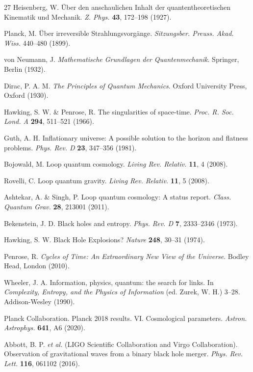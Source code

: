 \documentclass[11pt,a4paper]{article}
\theoremstyle{plain}
\begin{document}
\begin{thebibliography}{27}
Heisenberg, W. \"{U}ber den anschaulichen Inhalt der quantentheoretischen Kinematik und Mechanik. \textit{Z. Phys.} \textbf{43}, 172--198 (1927).

Planck, M. \"{U}ber irreversible Strahlungsvorg\"{a}nge. \textit{Sitzungsber. Preuss. Akad. Wiss.} 440--480 (1899).

von Neumann, J. \textit{Mathematische Grundlagen der Quantenmechanik}. Springer, Berlin (1932).

Dirac, P. A. M. \textit{The Principles of Quantum Mechanics}. Oxford University Press, Oxford (1930).

Hawking, S. W. \& Penrose, R. The singularities of space-time. \textit{Proc. R. Soc. Lond. A} \textbf{294}, 511--521 (1966).

Guth, A. H. Inflationary universe: A possible solution to the horizon and flatness problems. \textit{Phys. Rev. D} \textbf{23}, 347--356 (1981).

Bojowald, M. Loop quantum cosmology. \textit{Living Rev. Relativ.} \textbf{11}, 4 (2008).

Rovelli, C. Loop quantum gravity. \textit{Living Rev. Relativ.} \textbf{11}, 5 (2008).

Ashtekar, A. \& Singh, P. Loop quantum cosmology: A status report. \textit{Class. Quantum Grav.} \textbf{28}, 213001 (2011).

Bekenstein, J. D. Black holes and entropy. \textit{Phys. Rev. D} \textbf{7}, 2333--2346 (1973).

Hawking, S. W. Black Hole Explosions? \textit{Nature} \textbf{248}, 30--31 (1974).

Penrose, R. \textit{Cycles of Time: An Extraordinary New View of the Universe}. Bodley Head, London (2010).

Wheeler, J. A. Information, physics, quantum: the search for links. In \textit{Complexity, Entropy, and the Physics of Information} (ed. Zurek, W. H.) 3--28. Addison-Wesley (1990).

Planck Collaboration. Planck 2018 results. VI. Cosmological parameters. \textit{Astron. Astrophys.} \textbf{641}, A6 (2020).

Abbott, B. P. \textit{et al.} (LIGO Scientific Collaboration and Virgo Collaboration). Observation of gravitational waves from a binary black hole merger. \textit{Phys. Rev. Lett.} \textbf{116}, 061102 (2016).


\end{thebibliography}
\end{document}
